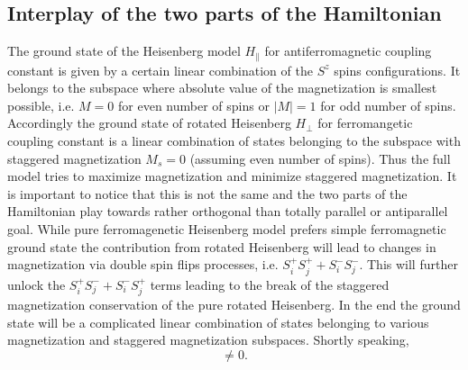 \documentclass[12pt, a4paper]{article}
\begin{document}
\subsection{Interplay of the two parts of the Hamiltonian}
The ground state of the Heisenberg model $H_{\parallel}$ for antiferromagnetic coupling constant is given by a certain linear combination of the $S^z$ spins configurations. It belongs to the subspace where absolute value of the magnetization is smallest possible, i.e. $M = 0$ for even number of spins or $|M| = 1$ for odd number of spins. Accordingly the ground state of rotated Heisenberg $H_{\perp}$ for ferromangetic coupling constant is a linear combination of states belonging to the subspace with staggered magnetization $M_s = 0$ (assuming even number of spins). Thus the full model tries to maximize magnetization and minimize staggered magnetization. It is important to notice that this is not the same and the two parts of the Hamiltonian play towards rather orthogonal than totally parallel or antiparallel goal. While pure ferromagenetic Heisenberg model prefers simple ferromagnetic ground state the contribution from rotated Heisenberg will lead to changes in magnetization via double spin flips processes, i.e. $S_i^+ S_j^+ + S_i^- S_j^-$. This will further unlock the $S_i^+ S_j^- + S_i^- S_j^+$ terms leading to the break of the staggered magnetization conservation of the pure rotated Heisenberg. In the end the ground state will be a complicated linear combination of states belonging to various magnetization and staggered magnetization subspaces. Shortly speaking,
\begin{equation}
[H_{\parallel}, H_{\perp}] \neq 0.
\end{equation}
\end{document}
